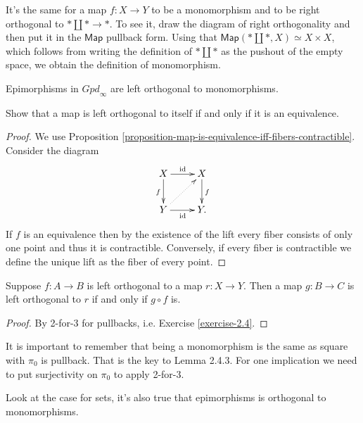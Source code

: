 \begin{example}
\label{example-monomorphism-iff-right-orthogonal-to-pushout}
It's the same for a map $f:X \to Y$ to be
a monomorphism and to be
right orthogonal to $* \amalg * \to *$.
To see it, draw the diagram of right orthogonality
and then put it in the $\mathsf{Map}$ pullback form.
Using that $\mathsf{Map}(* \amalg *,X)\simeq X\times X$,
which follows from writing the
definition of $* \amalg *$ as the pushout of
the empty space, we obtain the definition of
monomorphism.
\end{example}


\begin{lemma}
\label{lemma-epimorphisms-are-left-orthogonal-to-monomorphisms}
Epimorphisms in $\mathit{Gpd}_\infty$ are left orthogonal to
monomorphisms.
\end{lemma}

\begin{exercise}
\label{exercise-2.11}
Show that a map is left orthogonal
to itself if and only if it is an equivalence.
\end{exercise}

\begin{proof}
We use Proposition 
\ref{proposition-map-is-equivalence-iff-fibers-contractible}.
Consider the diagram
$$
\xymatrix{
X\ar[r]^{\text{id}}\ar[d]_{f}&X\ar[d]^{f}\\
Y\ar[r]_{\text{id}}\ar@{.>}[ur]&Y.
}
$$
If $f$ is an equivalence then 
by the existence of the lift
every fiber consists of only one point and
thus it is contractible.
Conversely, if every fiber is contractible
we define the unique lift as the fiber of every point.
\end{proof}

\begin{lemma}
\label{lemma-orthogonality-and-composition}
Suppose $f:A \to B$ is left orthogonal
to a map $r:X \to Y$.
Then a map $g:B \to C$ is left
orthogonal to $r$ if and only if $g \circ f$ is.
\end{lemma}

\begin{proof}
By 2-for-3 for pullbacks, i.e. Exercise \ref{exercise-2.4}.
\end{proof}

It is important to remember that
being a monomorphism is the same
as square with $\pi_0$ is pullback.
That is the key to Lemma 2.4.3.
For one implication we need
to put surjectivity on $\pi_0$
to apply 2-for-3.

Look at the case for sets,
it's also true that epimorphisms
is orthogonal to monomorphisms.

